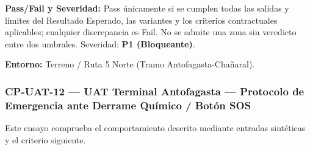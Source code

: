 \par\noindent\textbf{Pass/Fail y Severidad:} Pass únicamente si se cumplen todas las salidas y límites del Resultado Esperado, las variantes y los criterios contractuales aplicables; cualquier discrepancia es Fail. No se admite una zona sin veredicto entre dos umbrales. Severidad: \textbf{P1 (Bloqueante)}.\par
\par\noindent\textbf{Entorno:} Terreno / Ruta 5 Norte (Tramo Antofagasta-Chañaral).\par






\subsubsection*{CP-UAT-12 — UAT Terminal Antofagasta — Protocolo de Emergencia ante Derrame Químico / Botón SOS}\label{sec:9-cp-uat-12}
Este ensayo comprueba el comportamiento descrito mediante entradas sintéticas y el criterio siguiente.

